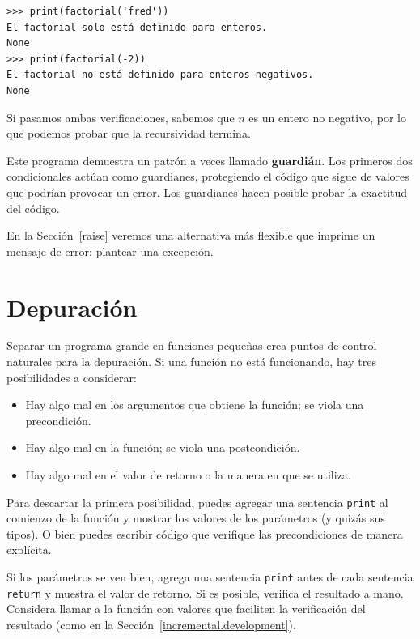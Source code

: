 \documentclass[10pt]{book}
\begin{document}
\begin{verbatim}
>>> print(factorial('fred'))
El factorial solo está definido para enteros.
None
>>> print(factorial(-2))
El factorial no está definido para enteros negativos.
None
\end{verbatim}
%
Si pasamos ambas verificaciones, sabemos que $n$ es un entero no negativo, por lo que podemos probar que la recursividad termina.

Este programa demuestra un patrón a veces llamado {\bf guardián}.
Los primeros dos condicionales actúan como guardianes, protegiendo el código que
sigue de valores que podrían provocar un error.  Los guardianes hacen
posible probar la exactitud del código.

En la Sección~\ref{raise} veremos una alternativa más flexible que imprime
un mensaje de error: plantear una excepción.


\section{Depuración}
\label{factdebug}

Separar un programa grande en funciones pequeñas crea puntos de control
naturales para la depuración.  Si una función no está
funcionando, hay tres posibilidades a considerar:

\begin{itemize}

\item Hay algo mal en los argumentos que obtiene
la función; se viola una precondición.

\item Hay algo mal en la función; se viola una
postcondición.

\item Hay algo mal en el valor de retorno o la
manera en que se utiliza.

\end{itemize}

Para descartar la primera posibilidad, puedes agregar una sentencia {\tt print}
al comienzo de la función y mostrar los valores de los
parámetros (y quizás sus tipos).  O bien puedes escribir código
que verifique las precondiciones de manera explícita.

Si los parámetros se ven bien, agrega una sentencia {\tt print} antes de cada
sentencia {\tt return} y muestra el valor de retorno.  Si es
posible, verifica el resultado a mano.  Considera llamar a la
función con valores que faciliten la verificación del resultado
(como en la Sección~\ref{incremental.development}).
\end{document}
